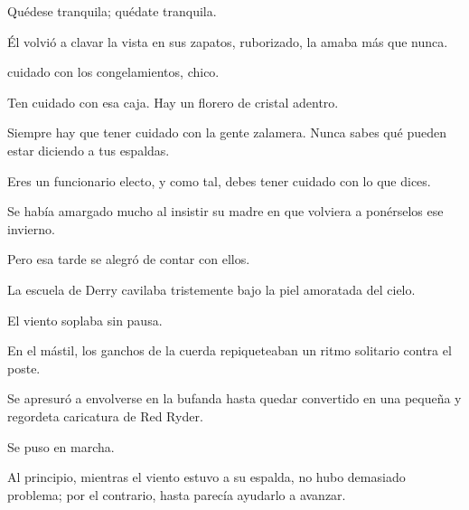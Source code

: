 

\sk
Quédese tranquila; quédate tranquila.

\sk
Él volvió a clavar la vista en sus zapatos,
ruborizado, la amaba más que nunca.

\sk
[Ten] cuidado con los congelamientos, chico.

\sk
Ten cuidado con esa caja. Hay un florero de cristal adentro.

\sk
Siempre hay que tener cuidado con la gente zalamera. Nunca sabes qué pueden estar diciendo a tus espaldas.

\sk
Eres un funcionario electo, y como tal, debes tener cuidado con lo que dices.

\sk
Se había amargado mucho
al insistir su madre en que volviera a ponérselos
ese invierno.
\nb{}

\sk
Pero esa tarde se alegró de contar con ellos.

\sk
La escuela de Derry cavilaba tristemente bajo
la piel amoratada del cielo.

\sk
El viento soplaba sin pausa.

\sk
En el mástil, los ganchos de la cuerda
repiqueteaban un ritmo solitario contra el poste.

\sk
Se apresuró a envolverse en la bufanda hasta
quedar convertido en una pequeña y regordeta
caricatura de Red Ryder.

\sk
Se puso en marcha.

\sk
Al principio, mientras el viento estuvo a su
espalda, no hubo demasiado problema; por el
contrario, hasta parecía ayudarlo a avanzar.


